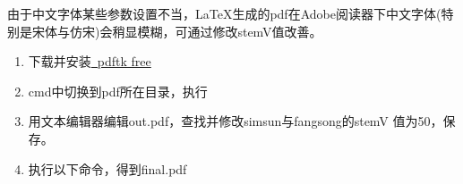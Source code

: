 \documentclass[twoside,longtitle]{LZUthesis}
\begin{document}
由于中文字体某些参数设置不当，\LaTeX{}生成的pdf在Adobe阅读器下中文字体(特别是宋体与仿宋)会稍显模糊，可通过修改stemV值改善。
\begin{enumerate}
\item 下载并安装\href{https://www.pdflabs.com/tools/pdftk-the-pdf-toolkit/}
{~pdftk free}
\item cmd中切换到pdf所在目录，执行



\item 用文本编辑器编辑out.pdf，查找并修改simsun与fangsong的stemV 值为50，保存。
\item 执行以下命令，得到final.pdf



\end{enumerate}
\end{document}
